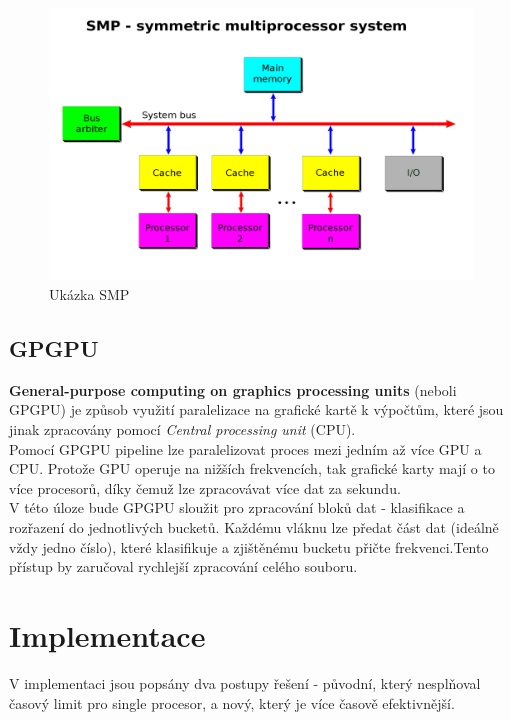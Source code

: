 \documentclass[12pt, a4paper]{article}
\begin{document}
\begin{figure}[!h]
\centering
\includegraphics[width=14cm]{img/smp}
\caption{Ukázka SMP}
\label{fig:smp}
\end{figure}

\subsection{GPGPU}
\textbf{General-purpose computing on graphics processing units} (neboli GPGPU) je způsob využití paralelizace na grafické kartě k výpočtům, které jsou jinak zpracovány pomocí \textit{Central processing unit} (CPU).\\
\indent Pomocí GPGPU pipeline lze paralelizovat proces mezi jedním až více GPU a CPU. Protože GPU operuje na nižších frekvencích, tak grafické karty mají o to více procesorů, díky čemuž lze zpracovávat více dat za sekundu. \\
\indent V této úloze bude GPGPU sloužit pro zpracování bloků dat - klasifikace a rozřazení do jednotlivých bucketů. Každému vláknu lze předat část dat (ideálně vždy jedno číslo), které klasifikuje a zjištěnému bucketu přičte frekvenci.Tento přístup by zaručoval rychlejší zpracování celého souboru.\\

\newpage







\section{Implementace}
V implementaci jsou popsány dva postupy řešení - původní, který nesplňoval časový limit pro single procesor, a nový, který je více časově efektivnější.
\end{document}
